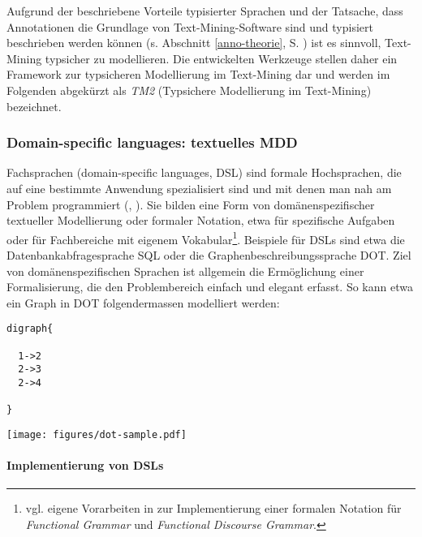 \documentclass[abstracton, 12pt]{scrartcl}
\begin{document}
Aufgrund der beschriebene Vorteile typisierter Sprachen und der Tatsache, dass Annotationen die Grundlage von Text-Mining-Software sind und typisiert beschrieben werden können (s. Abschnitt \ref{anno-theorie}, S. \pageref{anno-theorie}) ist es sinnvoll, Text-Mining typsicher zu modellieren. Die entwickelten Werkzeuge stellen daher ein Framework zur typsicheren Modellierung im Text-Mining dar und werden im Folgenden abgekürzt als \emph{TM2} (Typsichere Modellierung im Text-Mining) bezeichnet.

\subsubsection{Domain-specific languages: textuelles MDD} \label{basis-dsl}

Fachsprachen (domain-specific languages, DSL) sind formale Hochsprachen, die auf eine bestimmte Anwendung spezialisiert sind und mit denen man nah am Problem programmiert (\citealt[53]{HuntAndThomas2003}, \citealt[3]{Parr2007}). Sie bilden eine Form von domänenspezifischer textueller Modellierung oder formaler Notation, etwa für spezifische Aufgaben oder für Fachbereiche mit eigenem Vokabular\footnote{vgl. eigene Vorarbeiten in \citet{SteegEtAl2008} zur Implementierung einer formalen Notation für \emph{Functional Grammar} und \emph{Functional Discourse Grammar}.}. Beispiele für DSLs sind etwa die Datenbankabfragesprache SQL oder die Graphenbeschreibungssprache DOT. Ziel von domänenspezifischen Sprachen ist allgemein die Ermöglichung einer Formalisierung, die den Problembereich einfach und elegant erfasst. So kann etwa ein Graph in DOT folgendermassen modelliert werden:

 \begin{minipage}{2cm}
\begin{lstlisting}
digraph{

  1->2
  2->3
  2->4

}
\end{lstlisting}
  \end{minipage}
  \begin{minipage}{0.48\textwidth}
  \texttt{[image: figures/dot-sample.pdf]}
  \end{minipage}

\paragraph{Implementierung von DSLs}
\end{document}
